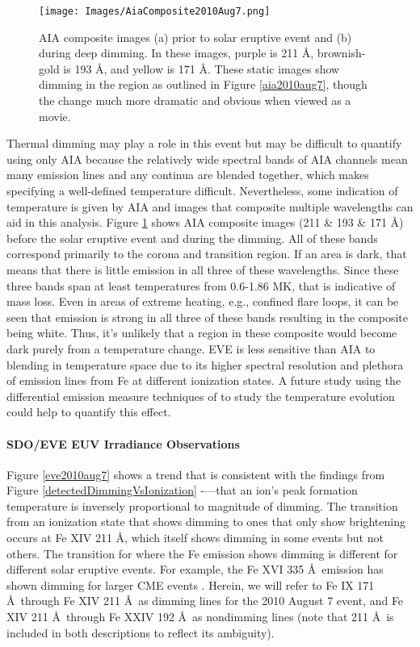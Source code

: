 \begin{figure}[!h]
	\caption[AIA before/after images of 2010 August 7 event]{
	    AIA composite images (a) prior to solar eruptive event and (b) during deep dimming. In these images, purple is 
	    211 \AA, brownish-gold is 193 \AA, and yellow is 171 \AA. These static images show dimming in the region as outlined 
	    in Figure \ref{aia2010aug7}, though the change much more dramatic and obvious when viewed as a movie. 
	}
    \begin{center}
	    \texttt{[image: Images/AiaComposite2010Aug7.png]}
    \end{center}
    \label{aiacomposite2010aug7}
\end{figure}

Thermal dimming may play a role in this event but may be difficult to quantify using only AIA because the relatively wide spectral bands of AIA channels mean many emission lines and any continua are blended together, which makes specifying a well-defined temperature difficult. Nevertheless, some indication of temperature is given by AIA and images that composite multiple wavelengths can aid in this analysis. Figure \ref{aiacomposite2010aug7} shows AIA composite images (211 \& 193 \& 171 \AA) before the solar eruptive event and during the dimming. All of these bands correspond primarily to the corona and transition region. If an area is dark, that means that there is little emission in all three of these wavelengths. Since these three bands span at least temperatures from 0.6-1.86 MK, that is indicative of mass loss. Even in areas of extreme heating, e.g., confined flare loops, it can be seen that emission is strong in all three of these bands resulting in the composite being white. Thus, it's unlikely that a region in these composite would become dark purely from a temperature change. EVE is less sensitive than AIA to blending in temperature space due to its higher spectral resolution and plethora of emission lines from Fe at different ionization states. A future study using the differential emission measure techniques of \citet{Caspi2014} to study the temperature evolution could help to quantify this effect.

\paragraph{SDO/EVE EUV Irradiance Observations}
Figure \ref{eve2010aug7} shows a trend that is consistent with the findings from Figure \ref{detectedDimmingVsIonization} -—that an ion’s peak formation temperature is inversely proportional to magnitude of dimming. The transition from an ionization state that shows dimming to ones that only show brightening occurs at Fe XIV 211 \AA, which itself shows dimming in some events but not others. The transition for where the Fe emission shows dimming is different for different solar eruptive events. For example, the Fe XVI 335 \AA\ emission has shown dimming for larger CME events \citep{Woods2011}. Herein, we will refer to Fe IX 171 \AA\ through Fe XIV 211 \AA\ as dimming lines for the 2010 August 7 event, and Fe XIV 211 \AA\ through Fe XXIV 192 \AA\ as nondimming lines (note that 211 \AA\ is included in both descriptions to reflect its ambiguity).

